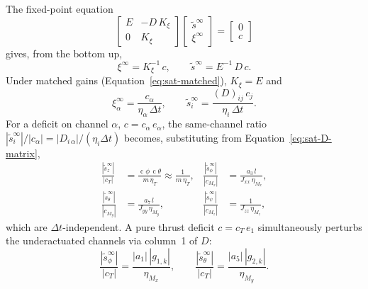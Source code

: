 \documentclass[conf]{new-aiaa}
\DeclareMathOperator{\cs}{c}
\begin{document}
The fixed-point equation
\small
\begin{equation}
\begin{bmatrix} E & -D \, K_\xi \\ 0 & K_\xi \end{bmatrix}
\begin{bmatrix} \tilde s^\infty \\ \xi^\infty \end{bmatrix}
=
\begin{bmatrix} 0 \\ c \end{bmatrix}
\end{equation}
\normalsize
gives, from the bottom up,
\begin{equation}
\label{eq:sat-xi-infty}
\xi^\infty = K_\xi^{-1}\, c,
\qquad
\tilde s^\infty = E^{-1}\, D\, c.
\end{equation}
Under matched gains (Equation~\ref{eq:sat-matched}), $K_\xi = E$ and
\begin{equation}
\xi_\alpha^\infty = \frac{c_\alpha}{\eta_\alpha\, \Delta t},
\qquad
\tilde s_i^\infty = \frac{(D)_{ij}\, c_j}{\eta_i\, \Delta t}.
\end{equation}
For a deficit on channel $\alpha$, $c = c_\alpha\, e_\alpha$, the same-channel ratio $|\tilde s_i^\infty|/|c_\alpha| = |D_{i\,\alpha}|/(\eta_i \Delta t)$ becomes, substituting from Equation~\ref{eq:sat-D-matrix},
\small
\begin{align}
\label{eq:sat-residual-T}
\frac{|\tilde s_z^\infty|}{|c_T|} &= \frac{\cs\phi\,\cs\theta}{m\, \eta_T} \approx \frac{1}{m\, \eta_T},
&
\frac{|\tilde s_\phi^\infty|}{|c_{M_x}|} &= \frac{a_3\, l}{J_{xx}\, \eta_{M_x}}, \\
\label{eq:sat-residual-theta}
\frac{|\tilde s_\theta^\infty|}{|c_{M_y}|} &= \frac{a_7\, l}{J_{yy}\, \eta_{M_y}},
&
\frac{|\tilde s_\psi^\infty|}{|c_{M_z}|} &= \frac{1}{J_{zz}\, \eta_{M_z}},
\end{align}
\normalsize
which are $\Delta t$-independent. A pure thrust deficit $c = c_T\, e_1$ simultaneously perturbs the underactuated channels via column~1 of $D$:
\small
\begin{equation}
\label{eq:sat-residual-cross}
\frac{|\tilde s_\phi^\infty|}{|c_T|} = \frac{|a_1|\, |g_{1,k}|}{\eta_{M_x}},
\qquad
\frac{|\tilde s_\theta^\infty|}{|c_T|} = \frac{|a_5|\, |g_{2,k}|}{\eta_{M_y}}.
\end{equation}
\normalsize
\end{document}
